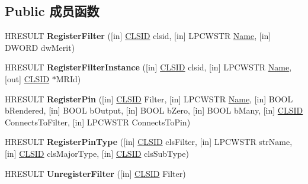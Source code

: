 \subsection*{Public 成员函数}
\begin{DoxyCompactItemize}
\item 
\mbox{\label{interfacestruct_ac30e6d4eb24aa637df61b0efa1617260}} 
H\+R\+E\+S\+U\+LT {\bfseries Register\+Filter} (\mbox{[}in\mbox{]} \hyperlink{struct___i_i_d}{C\+L\+S\+ID} clsid, \mbox{[}in\mbox{]} L\+P\+C\+W\+S\+TR \hyperlink{struct_name_rec__}{Name}, \mbox{[}in\mbox{]} D\+W\+O\+RD dw\+Merit)
\item 
\mbox{\label{interfacestruct_ab1cdee604caa174cc4654f2f2eca465e}} 
H\+R\+E\+S\+U\+LT {\bfseries Register\+Filter\+Instance} (\mbox{[}in\mbox{]} \hyperlink{struct___i_i_d}{C\+L\+S\+ID} clsid, \mbox{[}in\mbox{]} L\+P\+C\+W\+S\+TR \hyperlink{struct_name_rec__}{Name}, \mbox{[}out\mbox{]} \hyperlink{struct___i_i_d}{C\+L\+S\+ID} $\ast$M\+R\+Id)
\item 
\mbox{\label{interfacestruct_a5d40d722517fc4850ec89db6b0ef1da9}} 
H\+R\+E\+S\+U\+LT {\bfseries Register\+Pin} (\mbox{[}in\mbox{]} \hyperlink{struct___i_i_d}{C\+L\+S\+ID} Filter, \mbox{[}in\mbox{]} L\+P\+C\+W\+S\+TR \hyperlink{struct_name_rec__}{Name}, \mbox{[}in\mbox{]} B\+O\+OL b\+Rendered, \mbox{[}in\mbox{]} B\+O\+OL b\+Output, \mbox{[}in\mbox{]} B\+O\+OL b\+Zero, \mbox{[}in\mbox{]} B\+O\+OL b\+Many, \mbox{[}in\mbox{]} \hyperlink{struct___i_i_d}{C\+L\+S\+ID} Connects\+To\+Filter, \mbox{[}in\mbox{]} L\+P\+C\+W\+S\+TR Connects\+To\+Pin)
\item 
\mbox{\label{interfacestruct_a9ef9dd89f2b80105fd91953249b985be}} 
H\+R\+E\+S\+U\+LT {\bfseries Register\+Pin\+Type} (\mbox{[}in\mbox{]} \hyperlink{struct___i_i_d}{C\+L\+S\+ID} cls\+Filter, \mbox{[}in\mbox{]} L\+P\+C\+W\+S\+TR str\+Name, \mbox{[}in\mbox{]} \hyperlink{struct___i_i_d}{C\+L\+S\+ID} cls\+Major\+Type, \mbox{[}in\mbox{]} \hyperlink{struct___i_i_d}{C\+L\+S\+ID} cls\+Sub\+Type)
\item 
\mbox{\label{interfacestruct_a536c485a15cad46172e494c07ac75b8d}} 
H\+R\+E\+S\+U\+LT {\bfseries Unregister\+Filter} (\mbox{[}in\mbox{]} \hyperlink{struct___i_i_d}{C\+L\+S\+ID} Filter)
\item 

\end{DoxyCompactItemize}
